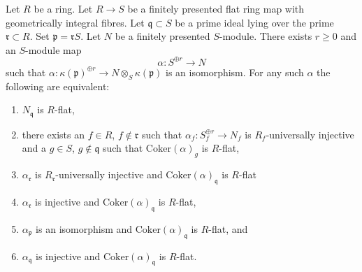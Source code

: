 \begin{lemma}
\label{lemma-induction-step-fp}
Let $R$ be a ring. Let $R \to S$ be a finitely presented
flat ring map with geometrically integral fibres. Let
$\mathfrak q \subset S$ be a prime ideal lying over the prime
$\mathfrak r \subset R$. Set $\mathfrak p = \mathfrak r S$.
Let $N$ be a finitely presented $S$-module.
There exists $r \geq 0$ and an $S$-module map
$$
\alpha : S^{\oplus r} \longrightarrow N
$$
such that
$\alpha : \kappa(\mathfrak p)^{\oplus r} \to N \otimes_S \kappa(\mathfrak p)$
is an isomorphism. For any such $\alpha$ the following are equivalent:
\begin{enumerate}
\item $N_{\mathfrak q}$ is $R$-flat,
\item there exists an $f \in R$, $f \not \in \mathfrak r$ such that
$\alpha_f : S_f^{\oplus r} \to N_f$ is $R_f$-universally injective and
a $g \in S$, $g \not \in \mathfrak q$ such that $\text{Coker}(\alpha)_g$
is $R$-flat,
\item $\alpha_{\mathfrak r}$ is $R_{\mathfrak r}$-universally injective and
$\text{Coker}(\alpha)_{\mathfrak q}$ is $R$-flat
\item $\alpha_{\mathfrak r}$ is injective and
$\text{Coker}(\alpha)_{\mathfrak q}$ is $R$-flat,
\item $\alpha_{\mathfrak p}$ is an isomorphism and
$\text{Coker}(\alpha)_{\mathfrak q}$ is $R$-flat, and
\item $\alpha_{\mathfrak q}$ is injective and
$\text{Coker}(\alpha)_{\mathfrak q}$ is $R$-flat.
\end{enumerate}
\end{lemma}

